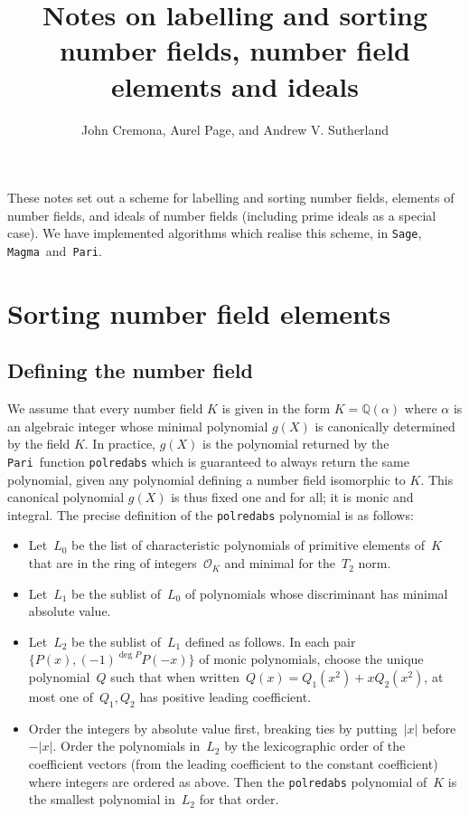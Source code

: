 \documentclass{article}
\title{Notes on labelling and sorting number fields, number field
  elements and ideals}
\author{John Cremona, Aurel Page, and Andrew V. Sutherland}
\def\Sage{{\tt Sage}}
\def\Magma{{\tt Magma}}
\def\Pari{{\tt Pari}}
\def\Q{{\mathbb Q}}
\def\OO{{\mathcal O}}
\begin{document}
\maketitle

These notes set out a scheme for labelling and sorting number fields,
elements of number fields, and ideals of number fields (including
prime ideals as a special case).  We have implemented algorithms which
realise this scheme, in \Sage, \Magma\ and~\Pari.

\section{Sorting number field elements}
\subsection{Defining the number field}
We assume that every number field $K$ is given in the form
$K=\Q(\alpha)$ where $\alpha$ is an algebraic integer whose
minimal polynomial $g(X)$ is canonically determined by the field $K$.
In practice, $g(X)$ is the
polynomial returned by the \Pari\ function {\tt polredabs} which
is guaranteed to always return the same polynomial, given any
polynomial defining a number field isomorphic to $K$.  This canonical
polynomial $g(X)$ is thus fixed one and for all; it is monic and
integral. The precise definition of the {\tt polredabs} polynomial is as
follows:

\begin{itemize}
  \item Let~$L_0$ be the list of characteristic polynomials of primitive
    elements of~$K$ that are in the ring of integers~$\OO_K$ and minimal for
    the~$T_2$ norm.
  \item Let~$L_1$ be the sublist of~$L_0$ of polynomials whose discriminant has
    minimal absolute value.
  \item Let~$L_2$ be the sublist of~$L_1$ defined as follows. In each
    pair~$\{P(x), (-1)^{\deg P}P(-x)\}$ of monic polynomials, choose the unique
    polynomial~$Q$ such that when written~$Q(x) = Q_1(x^2)+xQ_2(x^2)$, at most
    one of~$Q_1,Q_2$ has positive leading coefficient.
  \item Order the integers by absolute value first, breaking ties by
    putting~$|x|$ before~$-|x|$. Order the polynomials in~$L_2$ by the
    lexicographic order of the coefficient vectors (from the leading coefficient
    to the constant coefficient) where integers are ordered as above. Then the
    {\tt polredabs} polynomial of~$K$ is the smallest polynomial in~$L_2$ for
    that order.
\end{itemize}
\end{document}
